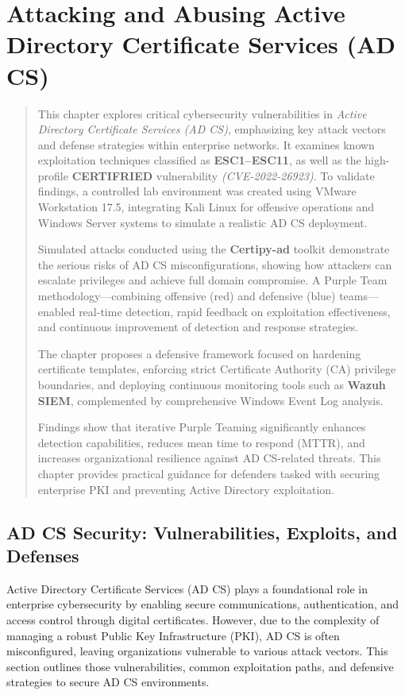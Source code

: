 \chapter{Attacking and Abusing Active Directory Certificate Services (AD CS)}

\begin{abstract}
This chapter explores critical cybersecurity vulnerabilities in \textit{Active Directory Certificate Services (AD CS)}, emphasizing key attack vectors and defense strategies within enterprise networks. It examines known exploitation techniques classified as \textbf{ESC1--ESC11}, as well as the high-profile \textbf{CERTIFRIED} vulnerability \textit{(CVE-2022-26923)}. To validate findings, a controlled lab environment was created using VMware Workstation 17.5, integrating Kali Linux for offensive operations and Windows Server systems to simulate a realistic AD CS deployment.

Simulated attacks conducted using the \textbf{Certipy-ad} toolkit demonstrate the serious risks of AD CS misconfigurations, showing how attackers can escalate privileges and achieve full domain compromise. A Purple Team methodology—combining offensive (red) and defensive (blue) teams—enabled real-time detection, rapid feedback on exploitation effectiveness, and continuous improvement of detection and response strategies.

The chapter proposes a defensive framework focused on hardening certificate templates, enforcing strict Certificate Authority (CA) privilege boundaries, and deploying continuous monitoring tools such as \textbf{Wazuh SIEM}, complemented by comprehensive Windows Event Log analysis.

Findings show that iterative Purple Teaming significantly enhances detection capabilities, reduces mean time to respond (MTTR), and increases organizational resilience against AD CS-related threats. This chapter provides practical guidance for defenders tasked with securing enterprise PKI and preventing Active Directory exploitation.
\end{abstract}

\section{AD CS Security: Vulnerabilities, Exploits, and Defenses}

Active Directory Certificate Services (AD CS) plays a foundational role in enterprise cybersecurity by enabling secure communications, authentication, and access control through digital certificates. However, due to the complexity of managing a robust Public Key Infrastructure (PKI), AD CS is often misconfigured, leaving organizations vulnerable to various attack vectors. This section outlines those vulnerabilities, common exploitation paths, and defensive strategies to secure AD CS environments.

